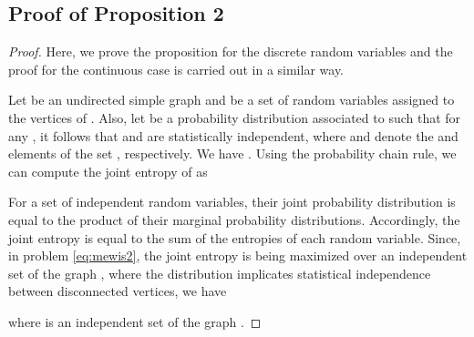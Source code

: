 \documentclass{article}
\begin{document}
\subsection{Proof of Proposition 2}
\begin{proof}
	Here, we prove the proposition for the discrete random variables and the proof for the continuous case is carried out in a similar way.
	
	Let  be an undirected simple graph and  be a set of random variables assigned to the vertices of . Also, let  be a probability distribution associated to  such that for any , it follows that  and  are statistically independent, where  and  denote the  and  elements of the set , respectively. We have . 
	Using the probability chain rule, we can compute the joint entropy of  as
	
	For a set of independent random variables, their joint probability distribution is equal to the product of their marginal probability distributions. Accordingly, the joint entropy is equal to the sum of the entropies of each random variable. Since, in problem \ref{eq:mewis2}, the joint entropy is being maximized over an independent set of the graph , where the distribution  implicates statistical independence between disconnected vertices, we have
	 
	where  is an independent set of the graph .
\end{proof}
\end{document}
